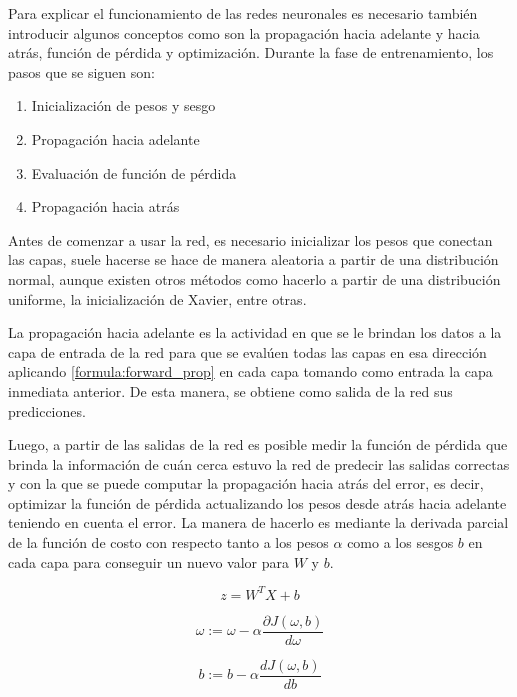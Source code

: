  Para explicar el funcionamiento de las redes neuronales es necesario también introducir algunos conceptos como son la propagación hacia adelante y hacia atrás, función de pérdida y optimización. Durante la fase de entrenamiento, los pasos que se siguen son:
 \begin{enumerate}
 	\item Inicialización de pesos y sesgo
 	\item Propagación hacia adelante
 	\item Evaluación de función de pérdida
 	\item Propagación hacia atrás
 \end{enumerate}
 Antes de comenzar a usar la red, es necesario inicializar los pesos que conectan las capas, suele hacerse se hace de manera aleatoria a partir de una distribución normal, aunque existen otros métodos como hacerlo a partir de una distribución uniforme, la inicialización de Xavier, entre otras.
 
 La propagación hacia adelante es la actividad en que se le brindan los datos a la capa de entrada de la red para que se evalúen todas las capas en esa dirección aplicando \ref{formula:forward_prop} en cada capa tomando como entrada la capa inmediata anterior. De esta manera, se obtiene como salida de la red sus predicciones. 
 
 Luego, a partir de las salidas de la red es posible medir la función de pérdida que brinda la información de cuán cerca estuvo la red de predecir las salidas correctas y con la que se puede computar la propagación hacia atrás del error, es decir, optimizar la función de pérdida actualizando los pesos desde atrás hacia adelante teniendo en cuenta el error. La manera de hacerlo es mediante la derivada parcial de la función de costo con respecto tanto a los pesos \(\alpha\) como a los sesgos \(b\) en cada capa para conseguir un nuevo valor para \(W\) y \(b\).
  
 
 \begin{equation}\label{formula:forward_prop}
 z=W^{T} X+b
 \end{equation}
 
 \begin{equation}
 \omega:=\omega-\alpha \frac{\partial J(\omega, b)}{d \omega}
 \end{equation}
 
 \begin{equation}
 b:=b-\alpha \frac{d J(\omega, b)}{d b}
 \end{equation}
 
